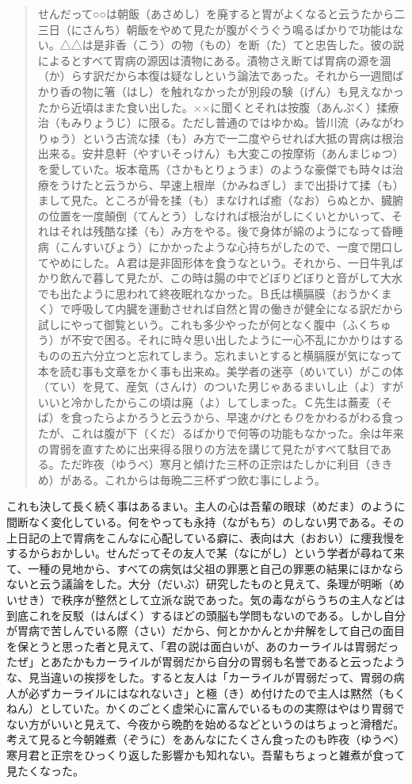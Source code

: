 \documentclass{book}
\begin{document}
\blockquote{せんだって○○は朝飯（あさめし）を廃すると胃がよくなると云うたから二三日（にさんち）朝飯をやめて見たが腹がぐうぐう鳴るばかりで功能はない。△△は是非香（こう）の物（もの）を断（た）てと忠告した。彼の説によるとすべて胃病の源因は漬物にある。漬物さえ断てば胃病の源を涸（か）らす訳だから本復は疑なしという論法であった。それから一週間ばかり香の物に箸（はし）を触れなかったが別段の験（げん）も見えなかったから近頃はまた食い出した。××に聞くとそれは按腹（あんぷく）揉療治（もみりょうじ）に限る。ただし普通のではゆかぬ。皆川流（みながわりゅう）という古流な揉（も）み方で一二度やらせれば大抵の胃病は根治出来る。安井息軒（やすいそっけん）も大変この按摩術（あんまじゅつ）を愛していた。坂本竜馬（さかもとりょうま）のような豪傑でも時々は治療をうけたと云うから、早速上根岸（かみねぎし）まで出掛けて揉（も）まして見た。ところが骨を揉（も）まなければ癒（なお）らぬとか、臓腑の位置を一度顛倒（てんとう）しなければ根治がしにくいとかいって、それはそれは残酷な揉（も）み方をやる。後で身体が綿のようになって昏睡病（こんすいびょう）にかかったような心持ちがしたので、一度で閉口してやめにした。Ａ君は是非固形体を食うなという。それから、一日牛乳ばかり飲んで暮して見たが、この時は腸の中でどぼりどぼりと音がして大水でも出たように思われて終夜眠れなかった。Ｂ氏は横膈膜（おうかくまく）で呼吸して内臓を運動させれば自然と胃の働きが健全になる訳だから試しにやって御覧という。これも多少やったが何となく腹中（ふくちゅう）が不安で困る。それに時々思い出したように一心不乱にかかりはするものの五六分立つと忘れてしまう。忘れまいとすると横膈膜が気になって本を読む事も文章をかく事も出来ぬ。美学者の迷亭（めいてい）がこの体（てい）を見て、産気（さんけ）のついた男じゃあるまいし止（よ）すがいいと冷かしたからこの頃は廃（よ）してしまった。Ｃ先生は蕎麦（そば）を食ったらよかろうと云うから、早速\emph{かけ}と\emph{もり}をかわるがわる食ったが、これは腹が下（くだ）るばかりで何等の功能もなかった。余は年来の胃弱を直すために出来得る限りの方法を講じて見たがすべて駄目である。ただ昨夜（ゆうべ）寒月と傾けた三杯の正宗はたしかに利目（ききめ）がある。これからは毎晩二三杯ずつ飲む事にしよう。}
これも決して長く続く事はあるまい。主人の心は吾輩の眼球（めだま）のように間断なく変化している。何をやっても永持（ながもち）のしない男である。その上日記の上で胃病をこんなに心配している癖に、表向は大（おおい）に痩我慢をするからおかしい。せんだってその友人で某（なにがし）という学者が尋ねて来て、一種の見地から、すべての病気は父祖の罪悪と自己の罪悪の結果にほかならないと云う議論をした。大分（だいぶ）研究したものと見えて、条理が明晰（めいせき）で秩序が整然として立派な説であった。気の毒ながらうちの主人などは到底これを反駁（はんばく）するほどの頭脳も学問もないのである。しかし自分が胃病で苦しんでいる際（さい）だから、何とかかんとか弁解をして自己の面目を保とうと思った者と見えて、「君の説は面白いが、あのカーライルは胃弱だったぜ」とあたかもカーライルが胃弱だから自分の胃弱も名誉であると云ったような、見当違いの挨拶をした。すると友人は「カーライルが胃弱だって、胃弱の病人が必ずカーライルにはなれないさ」と極（き）め付けたので主人は黙然（もくねん）としていた。かくのごとく虚栄心に富んでいるものの実際はやはり胃弱でない方がいいと見えて、今夜から晩酌を始めるなどというのはちょっと滑稽だ。考えて見ると今朝雑煮（ぞうに）をあんなにたくさん食ったのも昨夜（ゆうべ）寒月君と正宗をひっくり返した影響かも知れない。吾輩もちょっと雑煮が食って見たくなった。
\end{document}
